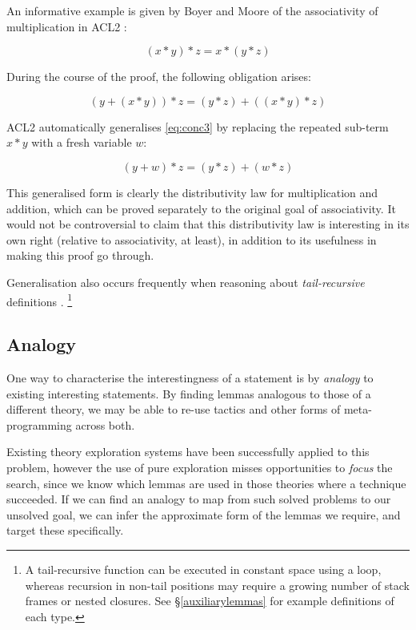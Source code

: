 \documentclass[]{article}
\begin{document}
An informative example is given by Boyer and Moore of the associativity of multiplication in ACL2 \cite{boyer1983proof}:

$$(x * y) * z = x * (y * z)$$

During the course of the proof, the following obligation arises:

\begin{equation}
  \tag{conc3}
  (y + (x * y)) * z = (y * z) + ((x * y) * z)
  \label{eq:conc3}
\end{equation}

ACL2 automatically generalises \eqref{eq:conc3} by replacing the repeated sub-term $x * y$ with a fresh variable $w$:

\begin{equation}
  \tag{conc4}
  (y + w) * z = (y * z) + (w * z)
  \label{eq:conc4}
\end{equation}

This generalised form is clearly the distributivity law for multiplication and addition, which can be proved separately to the original goal of associativity. It would not be controversial to claim that this distributivity law is interesting in its own right (relative to associativity, at least), in addition to its usefulness in making this proof go through.


Generalisation also occurs frequently when reasoning about \emph{tail-recursive} definitions \cite{kapur2003automatic}. \footnote{A tail-recursive function can be executed in constant space using a loop, whereas recursion in non-tail positions may require a growing number of stack frames or nested closures. See \S \ref{auxiliarylemmas} for example definitions of each type.}

\subsection{Analogy}

One way to characterise the interestingness of a statement is by \emph{analogy} to existing interesting statements. By finding lemmas analogous to those of a different theory, we may be able to re-use tactics and other forms of meta-programming across both.

Existing theory exploration systems have been successfully applied to this problem, however the use of pure exploration misses opportunities to \emph{focus} the search, since we know which lemmas are used in those theories where a technique succeeded. If we can find an analogy to map from such solved problems to our unsolved goal, we can infer the approximate form of the lemmas we require, and target these specifically.
\end{document}
